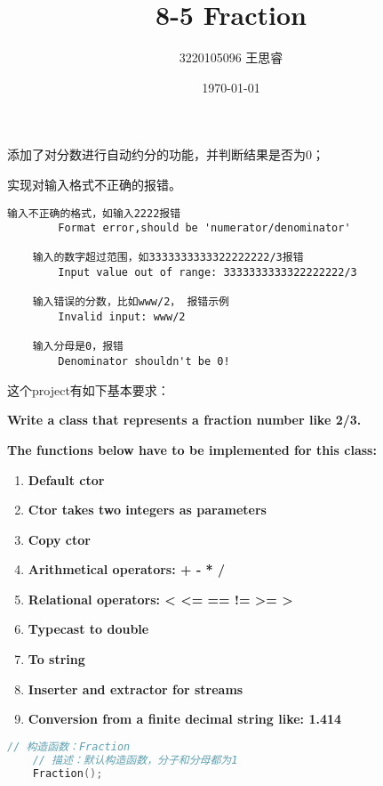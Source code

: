 \documentclass{ctexart} %
\title{8-5 Fraction}
\author{3220105096   \quad   王思睿}
\date{\today}
\begin{document}
\maketitle %

添加了对分数进行自动约分的功能，并判断结果是否为0；
\vspace{10pt}

实现对输入格式不正确的报错。
\vspace{10pt}

\begin{lstlisting}[caption = 报错示例]
    输入不正确的格式，如输入2222报错
        Format error,should be 'numerator/denominator'

    输入的数字超过范围，如3333333333322222222/3报错
        Input value out of range: 3333333333322222222/3

    输入错误的分数，比如www/2， 报错示例
        Invalid input: www/2

    输入分母是0，报错
        Denominator shouldn't be 0!
\end{lstlisting}
\vspace{10pt}

这个project有如下基本要求：

\textbf{Write a class that represents a fraction number like 2/3.}

\textbf{The functions below have to be implemented for this class:}
\begin{enumerate}[itemsep = 0pt, parsep = 0pt]
    \item \textbf{Default ctor}
    \item \textbf{Ctor takes two integers as parameters}
    \item \textbf{Copy ctor}
    \item \textbf{Arithmetical operators: + - * /}
    \item \textbf{Relational operators: < <= == != >= >}
    \item \textbf{Typecast to double}
    \item \textbf{To string}
    \item \textbf{Inserter and extractor for streams}
    \item \textbf{Conversion from a finite decimal string like: 1.414}
\end{enumerate}

\vspace{10pt}
\begin{lstlisting}[language = c++, caption=1.Default ctor]
    // 构造函数：Fraction
    // 描述：默认构造函数，分子和分母都为1
    Fraction();
\end{lstlisting}
\end{document}
